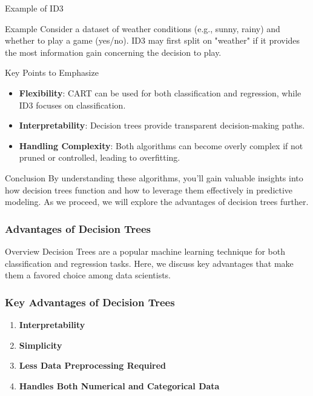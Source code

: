 \documentclass[aspectratio=169]{beamer}
\begin{document}
\begin{frame}[fragile]{Example of ID3}
    \begin{block}{Example}
        Consider a dataset of weather conditions (e.g., sunny, rainy) and whether to play a game (yes/no). 
        ID3 may first split on "weather" if it provides the most information gain concerning the decision to play.
    \end{block}
\end{frame}

\begin{frame}[fragile]{Key Points to Emphasize}
    \begin{itemize}
        \item \textbf{Flexibility}: CART can be used for both classification and regression, while ID3 focuses on classification.
        \item \textbf{Interpretability}: Decision trees provide transparent decision-making paths.
        \item \textbf{Handling Complexity}: Both algorithms can become overly complex if not pruned or controlled, leading to overfitting.
    \end{itemize}
\end{frame}

\begin{frame}[fragile]{Conclusion}
    By understanding these algorithms, you'll gain valuable insights into how decision trees function and how to leverage them effectively in predictive modeling. 
    As we proceed, we will explore the advantages of decision trees further.
\end{frame}

\begin{frame}[fragile]
    \frametitle{Advantages of Decision Trees}
    \begin{block}{Overview}
        Decision Trees are a popular machine learning technique for both classification and regression tasks. Here, we discuss key advantages that make them a favored choice among data scientists.
    \end{block}
\end{frame}

\begin{frame}[fragile]
    \frametitle{Key Advantages of Decision Trees}
    \begin{enumerate}
        \item \textbf{Interpretability}
        \item \textbf{Simplicity}
        \item \textbf{Less Data Preprocessing Required}
        \item \textbf{Handles Both Numerical and Categorical Data}
    \end{enumerate}
\end{frame}
\end{document}
